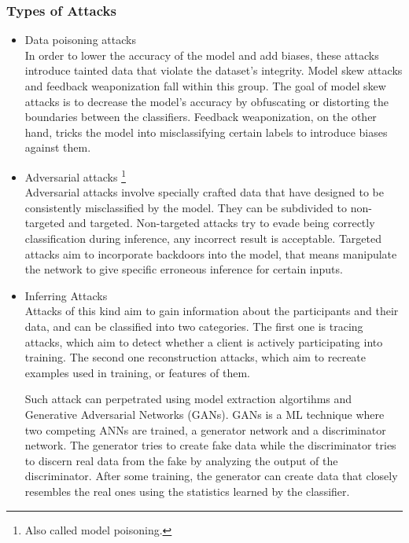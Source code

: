 \subsubsection{Types of Attacks} %

\begin{itemize}
  \item Data poisoning attacks\\
  In order to lower the accuracy of the model and add biases, these attacks introduce tainted data that violate the dataset's integrity. Model skew attacks \cite{Model_skewing_attacks} and feedback weaponization\cite{feedback_weaponization} fall within this group. The goal of model skew attacks is to decrease the model's accuracy by obfuscating or distorting the boundaries between the classifiers. Feedback weaponization, on the other hand, tricks the model into misclassifying certain labels to introduce biases against them.
  
  \item Adversarial attacks \footnote{Also called model poisoning.}\\
  Adversarial attacks \cite{adversarial_attack} involve specially crafted data that have designed to be consistently misclassified by the model. They can be subdivided to non-targeted and targeted. Non-targeted attacks try to evade being correctly classification during inference, any incorrect result is acceptable. Targeted attacks aim to incorporate backdoors into the model, that means manipulate the network to give specific erroneous inference for certain inputs.
  
  \item Inferring Attacks\\
  Attacks of this kind aim to gain information about the participants and their data, and can be classified into two categories. The first one is tracing attacks, which aim to detect whether a client is actively participating into training. The second one reconstruction attacks, which aim to recreate examples used in training, or features of them.
  
  Such attack can perpetrated using model extraction algortihms and Generative Adversarial Networks \cite{GAN_attack} (GANs). GANs is a ML technique where two competing ANNs are trained, a generator network and a discriminator network. The generator tries to create fake data while the discriminator tries to discern real data from the fake by analyzing the output of the discriminator. After some training, the generator can create data that closely resembles the real ones using the statistics learned by the classifier.
  

\end{itemize}
